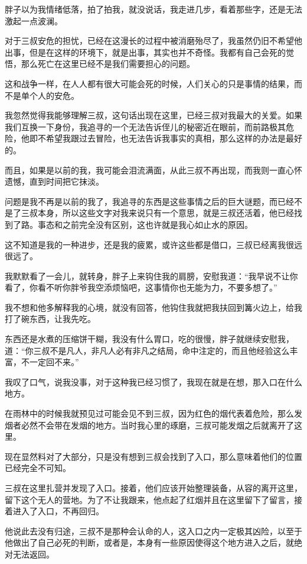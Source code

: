 胖子以为我情绪低落，拍了拍我，就没说话，我走进几步，看着那些字，还是无法激起一点波澜。

对于三叔安危的担忧，已经在这漫长的过程中被消磨殆尽了，我虽然仍旧不希望他出事，但是在这样的环境下，就是出事，其实也并不奇怪。我都有自己会死的觉悟，那么死亡在这里已经不是我们需要担心的问题。

这和战争一样，在人人都有很大可能会死的时候，人们关心的只是事情的结果，而不是单个人的安危。

我忽然觉得我能够理解三叔，这句话出现在这里，已经三叔对我最大的关爱。如果我们互换一下身份，我追寻的一个无法告诉侄儿的秘密近在眼前，而前路极其危险，他即不希望我跟过去冒险，也无法告诉我事实的真相，那么这样的办法是最好的。

而且，如果是以前的我，我可能会泪流满面，从此三叔不再出现，而我则一直心怀遗憾，直到时间把它抹淡。

问题是我不再是以前的我了，我追寻的东西是这些事情之后的巨大谜题，而已经不是了三叔本身，所以这些文字对我来说只有一个意思，就是三叔还活着，他已经找到了路。事态和之前完全没有区别，这也许就是我心如止水的原因。

这不知道是我的一种进步，还是我的疲累，或许这些都是借口，三叔已经离我很远很远了。

我默默看了一会儿，就转身，胖子上来钩住我的肩膀，安慰我道：“我早说不让你看了，你看不听你胖爷我空添烦恼吧，这事情你也无能为力，不要多想了。”

我不想和他多解释我的心境，就没有回答，他钩住我就把我扶回到篝火边上，给我打了碗东西，让我先吃。

东西还是水煮的压缩饼干糊，我没有什么胃口，吃的很慢，胖子就继续安慰我，道：“你三叔不是凡人，非凡人必有非凡之结局，命中注定的，而且他经验这么丰富，不一定回不来。”

我叹了口气，说我没事，对于这种我已经习惯了，我现在就是在想，那入口在什么地方。

在雨林中的时候我就预见过可能会见不到三叔，因为红色的烟代表着危险，那么发烟者必然不会带在发烟的地方。当时我心里的琢磨，三叔可能发烟之后就离开了这里。

现在显然料对了大部分，只是没有想到三叔会找到了入口，那么意味着他们的位置已经完全不可知。

三叔在这里扎营并发现了入口。接着，他们应该开始整理装备，从容的离开这里，留下这个无人的营地。为了不让我跟来，他点起了红烟并且在这里留下了留言，接着进入了入口，不再回归。

他说此去没有归途，三叔不是那种会认命的人，这入口之内一定极其凶险，以至于他做出了自己必死的判断，或者是，本身有一些原因使得这个地方进入之后，就绝对无法返回。

